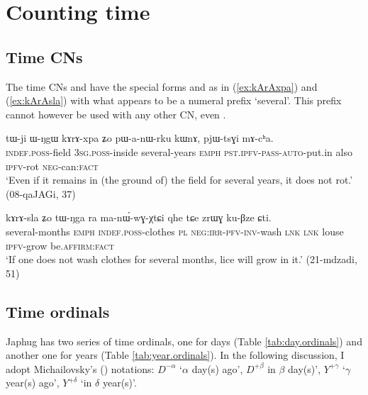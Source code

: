 \section{Counting time} \label{sec:time}
\subsection{Time CNs} \label{sec:CN.time}
  
The time CNs  and  have the special forms  and  as in (\ref{ex:kArAxpa}) and (\ref{ex:kArAsla}) with what appears to be a numeral prefix  `several'. This prefix cannot however be used with any other CN, even . 

\begin{exe}
\ex \label{ex:kArAxpa}
\gll tɯ-ji ɯ-ŋgɯ kɤrɤ-xpa ʑo pɯ-a-nɯ-rku kɯnɤ, pjɯ-tsɣi mɤ-cʰa. \\
\textsc{indef}.\textsc{poss}-field \textsc{3sg}.\textsc{poss}-inside several-years \textsc{emph} \textsc{pst}.\textsc{ipfv}-\textsc{pass}-\textsc{auto}-put.in also \textsc{ipfv}-rot \textsc{neg}-can:\textsc{fact} \\
\glt `Even if it remains in (the ground of) the field for several years, it does not rot.' (08-qaJAGi, 37)
\end{exe}

\begin{exe}
\ex \label{ex:kArAsla}
\gll
kɤrɤ-sla ʑo tɯ-ŋga ra ma-nɯ́-wɣ-χtɕi qhe tɕe zrɯɣ ku-βze ɕti.  \\
several-months \textsc{emph} \textsc{indef}.\textsc{poss}-clothes \textsc{pl} \textsc{neg}:\textsc{irr}-\textsc{pfv}-\textsc{inv}-wash \textsc{lnk} \textsc{lnk} louse \textsc{ipfv}-grow be.\textsc{affirm}:\textsc{fact} \\
\glt `If one does not wash clothes for several months, lice will grow in it.' (21-mdzadi, 51)
\end{exe}


\subsection{Time ordinals} \label{sec:time.ordinals}
Japhug has two series of time ordinals, one for days (Table \ref{tab:day.ordinals}) and another one for years (Table \ref{tab:year.ordinals}).  In the following discussion, I adopt Michailovsky's (\citeyear{michailovsky03ordinals}) notations: $D^{-\alpha}$ `$\alpha$ day(s) ago', $D^{+\beta}$ in $\beta$ day(s)', $Y^{+ \gamma}$ `$\gamma$ year(s) ago', $Y^{+ \delta}$  `in $\delta$ year(s)'.

